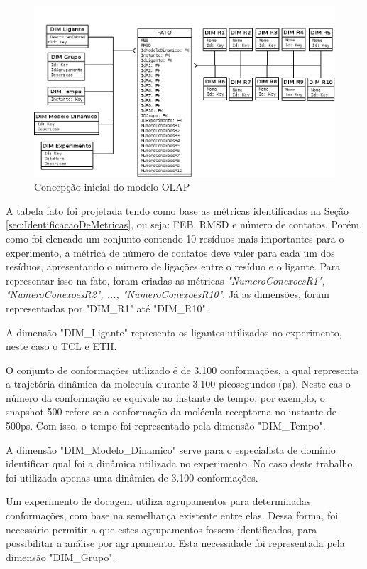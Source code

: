 \begin{itemize}
\begin{figure}[h]
        \center
        \includegraphics[scale=0.7]{images/Modelo_OLAP.PNG}
        \caption{Concepção inicial do modelo OLAP}
        \label{fig:ConcepcaoModeloOLAP}
\end{figure}

A tabela fato foi projetada tendo como base as métricas identificadas na Seção \ref{sec:IdentificacaoDeMetricas}, ou seja: FEB, RMSD e número de contatos. Porém, como foi elencado um conjunto contendo 10 resíduos mais importantes para o experimento, a métrica de número de contatos deve valer para cada um dos resíduos, apresentando o número de ligações entre o resíduo e o ligante. Para representar isso na fato, foram criadas as métricas \emph{"NumeroConexoesR1", "NumeroConexoesR2", ..., "NumeroConexoesR10"}. Já as dimensões, foram representadas por "DIM\_R1" até "DIM\_R10".

A dimensão "DIM\_Ligante" representa os ligantes utilizados no experimento, neste caso o TCL e ETH.

O conjunto de conformações utilizado é de 3.100 conformações, a qual representa a trajetória dinâmica da molecula durante 3.100 picosegundos (ps). Neste cas o número da conformação se equivale ao instante de tempo, por exemplo, o snapshot 500 refere-se a conformação da molécula receptorna no instante de 500ps. Com isso, o tempo foi representado pela dimensão "DIM\_Tempo". 

A dimensão "DIM\_Modelo\_Dinamico" serve para o especialista de domínio identificar qual foi a dinâmica utilizada no experimento. No caso deste trabalho, foi utilizada apenas uma dinâmica de 3.100 conformações.

Um experimento de docagem utiliza agrupamentos para determinadas conformações, com base na semelhança existente entre elas. Dessa forma, foi necessário permitir a que estes agrupamentos fossem identificados, para possibilitar a análise por agrupamento. Esta necessidade foi representada pela dimensão "DIM\_Grupo".


\end{itemize}
